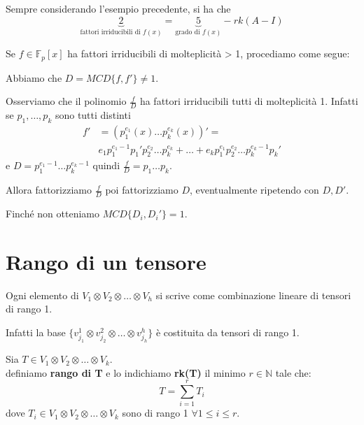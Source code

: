 \documentclass[10pt,a4paper,twoside]{book}
\begin{document}
\begin{example}
    Sempre considerando l'esempio precedente, si ha che
    \begin{equation*}
        \underbrace{2}_{\text{fattori irriducibili di $f(x)$}} = \underbrace{5}_{\text{grado di $f(x)$}} - rk(A - I)
    \end{equation*}
\end{example}

Se $f \in \mathbb{F}_p[x]$ ha fattori irriducibili di molteplicità > 1, procediamo come segue:

Abbiamo che $D = MCD\{f, f'\} \neq 1$.

Osserviamo che il polinomio $\frac{f}{D}$ ha fattori irriducibili tutti di molteplicità 1. Infatti se $p_1, \ldots , p_k$ sono tutti distinti
\begin{align*}
    f' & = (p_1^{e_1}(x) \ldots p_k^{e_k}(x))' =                                                                     \\
       & e_1 p_1^{e_1 - 1} p_1'p_2^{e_2} \ldots p_k^{e_k} + \ldots + e_k p_1^{e_1}p_2^{e_2} \ldots p_k^{e_k - 1}p_k'
\end{align*}
e $D = p_1^{e_1 - 1} \ldots p_k^{e_k - 1}$ quindi $\frac{f}{D} = p_1 \ldots p_k$.

Allora fattorizziamo $\frac{f}{D}$ poi fattorizziamo $D$, eventualmente ripetendo con $D, D'$.

Finché non otteniamo $MCD\{ D_i, D_i'\} = 1$.

\newpage

\section{Rango di un tensore}

Ogni elemento di $V_1 \otimes V_2 \otimes \ldots \otimes V_h$ si scrive come combinazione lineare di tensori di rango 1.

Infatti la base $\{v_{j_1}^1 \otimes v_{j_2}^2 \otimes \ldots \otimes v_{j_h}^h\}$ è costituita da tensori di rango 1.
\begin{definition}
    Sia $T \in V_1 \otimes V_2 \otimes \ldots \otimes V_k$.\\
    definiamo \textbf{rango di T} e lo indichiamo \textbf{rk(T)} il minimo $r \in \mathbb{N}$ tale che:
    \begin{equation*}
        T = \sum_{i=1}^{r}T_i
    \end{equation*}
    dove $T_i \in V_1 \otimes V_2 \otimes \ldots \otimes V_k$ sono di rango 1 $\forall 1 \leq i \leq r$.
\end{definition}
\end{document}
